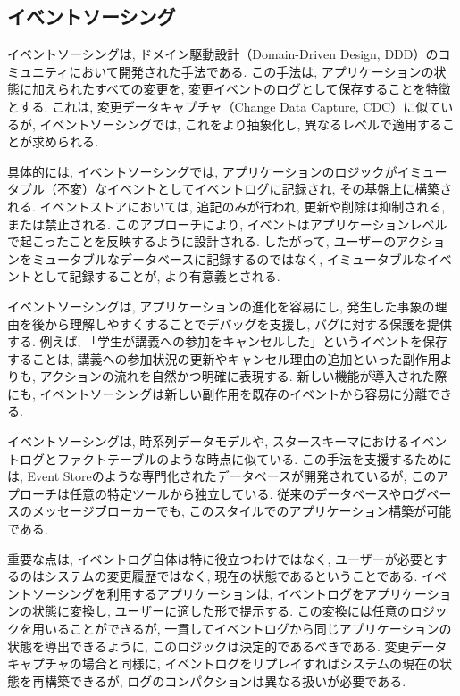 \documentclass[../../../main]{subfiles}
\begin{document}
    \subsection{イベントソーシング}\label{subsec:phraseology-event_sourcing}
    イベントソーシング\cite{DB指向イベントソーシング}は, ドメイン駆動設計（Domain-Driven Design, DDD）のコミュニティにおいて開発された手法である. この手法は, アプリケーションの状態に加えられたすべての変更を, 変更イベントのログとして保存することを特徴とする. これは, 変更データキャプチャ（Change Data Capture, CDC）に似ているが, イベントソーシングでは, これをより抽象化し, 異なるレベルで適用することが求められる.

    具体的には, イベントソーシングでは, アプリケーションのロジックがイミュータブル（不変）なイベントとしてイベントログに記録され, その基盤上に構築される. イベントストアにおいては, 追記のみが行われ, 更新や削除は抑制される, または禁止される. このアプローチにより, イベントはアプリケーションレベルで起こったことを反映するように設計される. したがって, ユーザーのアクションをミュータブルなデータベースに記録するのではなく, イミュータブルなイベントとして記録することが, より有意義とされる.

    イベントソーシングは, アプリケーションの進化を容易にし, 発生した事象の理由を後から理解しやすくすることでデバッグを支援し, バグに対する保護を提供する. 例えば, 「学生が講義への参加をキャンセルした」というイベントを保存することは, 講義への参加状況の更新やキャンセル理由の追加といった副作用よりも, アクションの流れを自然かつ明確に表現する. 新しい機能が導入された際にも, イベントソーシングは新しい副作用を既存のイベントから容易に分離できる.

    イベントソーシングは, 時系列データモデルや, スタースキーマにおけるイベントログとファクトテーブルのような時点に似ている. この手法を支援するためには, Event Storeのような専門化されたデータベースが開発されているが, このアプローチは任意の特定ツールから独立している. 従来のデータベースやログベースのメッセージブローカーでも, このスタイルでのアプリケーション構築が可能である.

    重要な点は, イベントログ自体は特に役立つわけではなく, ユーザーが必要とするのはシステムの変更履歴ではなく, 現在の状態であるということである. イベントソーシングを利用するアプリケーションは, イベントログをアプリケーションの状態に変換し, ユーザーに適した形で提示する. この変換には任意のロジックを用いることができるが, 一貫してイベントログから同じアプリケーションの状態を導出できるように, このロジックは決定的であるべきである. 変更データキャプチャの場合と同様に, イベントログをリプレイすればシステムの現在の状態を再構築できるが, ログのコンパクションは異なる扱いが必要である.
\end{document}
